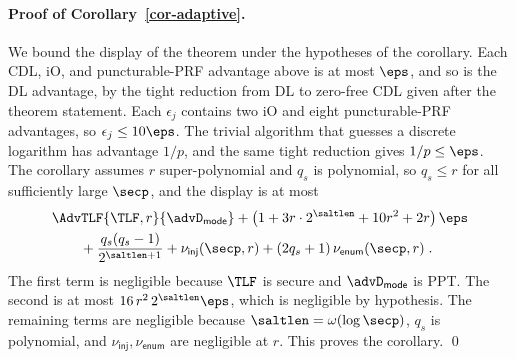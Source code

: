 \paragraph*{Proof of Corollary~\ref{cor-adaptive}.} We bound the display of the theorem under the hypotheses of the corollary. Each CDL, iO, and puncturable-PRF advantage above is at most $\eps$, and so is the DL advantage, by the tight reduction from DL to zero-free CDL given after the theorem statement. Each $\epsilon_j$ contains two iO and eight puncturable-PRF advantages, so $\epsilon_j\le10\eps$. The trivial algorithm that guesses a discrete logarithm has advantage $1/p$, and the same tight reduction gives $1/p\le\eps$. The corollary assumes $r$ super-polynomial and $q_s$ is polynomial, so $q_s\le r$ for all sufficiently large $\secp$, and the display is at most
$$
\begin{aligned}
&\AdvTLF{\TLF,r}{\advD_{\mathsf{mode}}}
+\left(1+3r\cdot2^{\saltlen}+10r^2+2r\right)\eps\\
&\qquad
+\frac{q_s(q_s-1)}{2^{\saltlen+1}}
+\nu_{\mathsf{inj}}(\secp,r)
+(2q_s+1)\,\nu_{\mathsf{enum}}(\secp,r) \;.
\end{aligned}
$$
The first term is negligible because $\TLF$ is secure and $\advD_{\mathsf{mode}}$ is PPT. The second is at most $16\,r^2\,2^{\saltlen}\eps$, which is negligible by hypothesis. The remaining terms are negligible because $\saltlen=\omega(\log\secp)$, $q_s$ is polynomial, and $\nu_{\mathsf{inj}},\nu_{\mathsf{enum}}$ are negligible at $r$. This proves the corollary. \qed
{}
